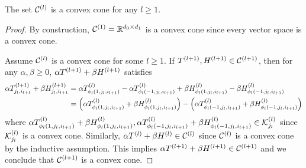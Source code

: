 
\begin{lemma}\label{lemma:convex-recursive-cone-constraint}
    The set \( \mathcal{C}^{(l)} \) is a convex cone for any \( l \geq 1 \).
\end{lemma}
\begin{proof}
    By construction, \( \mathcal{C}^{(1)} = \mathbb{R}^{d_0 \times d_1} \)
    is a convex cone since every vector space is a convex cone.

    Assume \( \mathcal{C}^{(l)} \) is a convex cone for some \( l \geq 1 \).
    If \( T^{(l+1)}, H^{(l+1)} \in \mathcal{C}^{(l+1)} \), then
    for any \( \alpha, \beta \geq 0 \),
    \( \alpha T^{(l+1)} + \beta H^{(l+1)} \) satisfies
    \begin{align*}
        \alpha T^{(l+1)}_{j_l, i_{l+1}} + \beta H^{(l+1)}_{j_l, i_{l+1}}
         & = \alpha T^{(l)}_{ \phi_l(1, j_l, i_{l+1})}
        - \alpha T^{(l)}_{ \phi_l(-1, j_l, i_{l+1})}
        + \beta H^{(l)}_{ \phi_l(1, j_l, i_{l+1})}
        - \beta H^{(l)}_{ \phi_l(-1, j_l, i_{l+1})}                                                 \\
         & = \left(\alpha T^{(l)}_{ \phi_l(1, j_l, i_{l+1})} + \beta H^{(l)}_{ \phi_l(1, j_l, i_{l+1})}\right)
        - \left(\alpha T^{(l)}_{ \phi_l(-1, j_l, i_{l+1})} + \beta H^{(l)}_{ \phi_l(-1, j_l, i_{l+1})}\right)
    \end{align*}
    where \( \alpha T^{(l)}_{ \phi_l(1, j_l, i_{l+1})} + \beta H^{(l)}_{\phi_l(1, j_l, i_{l+1})},
    \alpha T^{(l)}_{ \phi_l(-1, j_l, i_{l+1})} + \beta H^{(l)}_{ \phi_l(-1, j_l, i_{l+1})}
    \in \mathcal{K}^{(l)}_{j_l} \) since \( \mathcal{K}^{(l)}_{j_l} \) is a convex cone.
    Similarly, \( \alpha T^{(l)} + \beta H^{(l)} \in \mathcal{C}^{(l)} \)
    since \( \mathcal{C}^{(l)} \) is a convex cone by the inductive assumption.
    This implies \( \alpha T^{(l+1)} + \beta H^{(l+1)} \in \mathcal{C}^{(l+1)} \)
    and we conclude that \( \mathcal{C}^{(l+1)} \) is a convex cone.
\end{proof}


